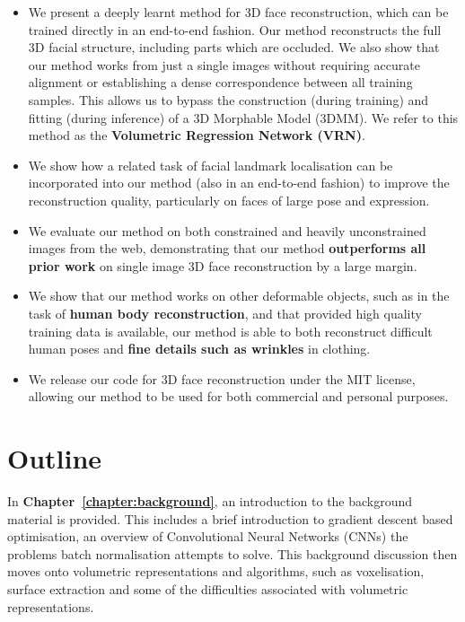 \begin{itemize}
\item %
  We present a deeply learnt method for 3D face reconstruction, which
  can be trained directly in an end-to-end fashion. Our method
  reconstructs the full 3D facial structure, including parts which are
  occluded. We also show that our method works from just a single
  images without requiring accurate alignment or establishing a dense
  correspondence between all training samples.  This allows us to
  bypass the construction (during training) and fitting (during
  inference) of a 3D Morphable Model (3DMM).  We refer to this method
  as the \textbf{Volumetric Regression Network (VRN)}.

\item We show how a related task of facial landmark localisation can
  be incorporated into our method (also in an end-to-end fashion) to
  improve the reconstruction quality, particularly on faces of large
  pose and expression.

\item We evaluate our method on both constrained and heavily
  unconstrained images from the web, demonstrating that our method
  \textbf{outperforms all prior work} on single image 3D face
  reconstruction by a large margin.

\item We show that our method works on other deformable objects, such
  as in the task of \textbf{human body reconstruction}, and that
  provided high quality training data is available, our method is able
  to both reconstruct difficult human poses and \textbf{fine details
    such as wrinkles} in clothing.

\item We release our code for 3D face reconstruction under the MIT
  license, allowing our method to be used for both commercial and
  personal purposes.
\end{itemize}

\section{Outline}

In \textbf{Chapter~\ref{chapter:background}}, an introduction to the
background material is provided. This includes a brief introduction to
gradient descent based optimisation, an overview of Convolutional
Neural Networks (CNNs) the problems batch normalisation attempts to
solve. This background discussion then moves onto volumetric
representations and algorithms, such as voxelisation, surface
extraction and some of the difficulties associated with volumetric
representations.

